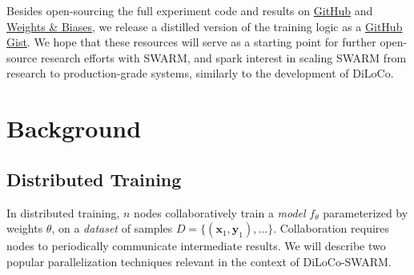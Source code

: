 \documentclass{article}
\newcommand{\github}{\href{https://github.com/mikasenghaas/diloco-swarm}{GitHub}}
\newcommand{\wandb}{\href{https://wandb.ai/mikasenghaas/diloco-swarm}{Weights \& Biases}}
\newcommand{\gist}{\href{https://gist.github.com/mikasenghaas/5fa1aa77ea69f187f531a5889983c249}{GitHub Gist}}
\begin{document}
Besides open-sourcing the full experiment code and results on \github{} and
\wandb{}, we release a distilled version of the training logic as a \gist{}. We
hope that these resources will serve as a starting point for further open-source
research efforts with SWARM, and spark interest in scaling SWARM from research
to production-grade systems, similarly to the development of DiLoCo.

\section{Background}

\subsection{Distributed Training}

In distributed training, $n$ nodes collaboratively train a \textit{model}
$f_{\theta}$ parameterized by weights $\theta$, on a \textit{dataset} of samples
$D = \{(\mathbf{x}_1, \mathbf{y}_1),\dots\}$. Collaboration requires nodes to
periodically communicate intermediate results. We will describe two popular
parallelization techniques relevant in the context of DiLoCo-SWARM.
\end{document}
